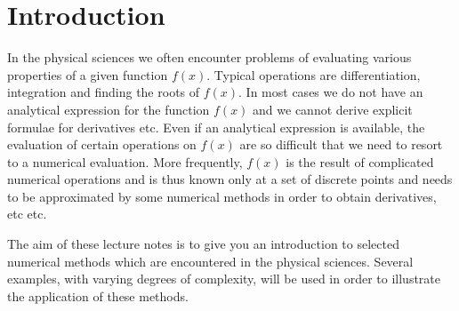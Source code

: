 
\chapter{Introduction}

In the physical sciences we often encounter problems of evaluating
various properties of a given function $f(x)$. Typical 
operations are differentiation, integration and finding the roots of
$f(x)$. In most cases we do not have an analytical
expression for the function $f(x)$ and we cannot derive
explicit formulae for derivatives etc. Even if an analytical
expression is available, the evaluation of 
certain operations on $f(x)$ are so difficult that we need
to resort to a numerical evaluation. More frequently, $f(x)$ is the 
result of complicated numerical operations and is thus known
only at a set of discrete points and needs to be 
approximated by some numerical methods in order
to obtain  derivatives, etc etc. 

The aim of these lecture notes is to give you an introduction to selected 
numerical methods which are encountered in the physical
sciences. Several examples, with varying 
degrees of complexity,  will be used in order
to illustrate the application of these methods. 


